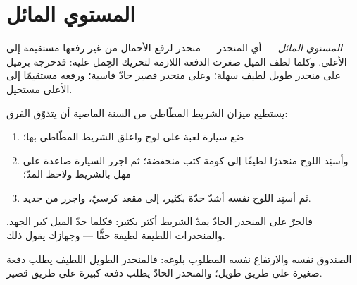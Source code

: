 \section{المستوي المائل}

\begin{definition}\label{def:g5:simple-machines:ramp}
\emph{المستوي المائل} --- أي المنحدر --- منحدر
لرفع الأحمال من غير رفعها مستقيمة إلى الأعلى. وكلما لطف الميل
صغرت الدفعة اللازمة لتحريك الحِمل عليه: فدحرجة برميل على منحدر
طويل لطيف سهلة؛ وعلى منحدر قصير حادّ قاسية؛ ورفعه مستقيمًا إلى
الأعلى مستحيل.
\end{definition}

\begin{method}\label{met:g5:simple-machines:measure}
يستطيع ميزان الشريط المطّاطي من السنة الماضية أن يتذوّق الفرق:
\begin{enumerate}
  \item ضع سيارة لعبة على لوح واعلق الشريط المطّاطي بها؛
  \item وأسنِد اللوح منحدرًا لطيفًا إلى كومة كتب منخفضة؛ ثم
        اجرر السيارة صاعدة على مهل بالشريط ولاحظ المدّ؛
  \item ثم أسنِد اللوح نفسه أشدّ حدّة بكثير، إلى مقعد كرسيّ،
        واجرر من جديد.
\end{enumerate}
فالجرّ على المنحدر الحادّ يمدّ الشريط أكثر بكثير: فكلما حدّ
الميل كبر الجهد. والمنحدرات اللطيفة لطيفة حقًّا --- وجهازك يقول
ذلك.
\end{method}

\begin{omfigure}

{\small الصندوق نفسه والارتفاع نفسه المطلوب بلوغه: فالمنحدر
الطويل اللطيف يطلب دفعة صغيرة على طريق طويل؛ والمنحدر الحادّ
يطلب دفعة كبيرة على طريق قصير.}
\end{omfigure}

